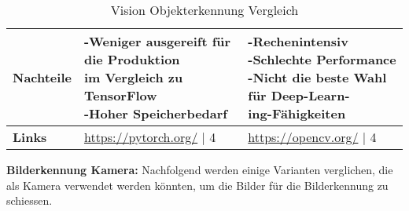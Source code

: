 \begin{table}[H]
\begin{tabularx}{\textwidth}{|l|X|X|}
  \textbf{Nachteile} & \makecell{-Weniger ausgereift für die Produktion \\ im Vergleich zu TensorFlow \\ -Hoher Speicherbedarf} & \makecell{-Rechenintensiv \\ -Schlechte Performance \\ -Nicht die beste Wahl für Deep-Learn-\\ing-Fähigkeiten} \\
  \hline
  \textbf{Links} & \url{https://pytorch.org/} | 4  & \url{https://opencv.org/} | 4\\
  \hline
\end{tabularx}
\caption{Vision Objekterkennung Vergleich}
\label{table:vision-object-detection-compare}
\end{table}

\newpage

\textbf{Bilderkennung Kamera:} Nachfolgend werden einige Varianten verglichen, die als Kamera verwendet werden könnten, um die Bilder für die Bilderkennung zu schiessen.

